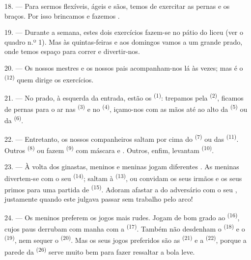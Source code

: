 \VUsaut{5.0mm}
\VUsaut{2.4mm}
\VUsaut{3.0mm}

18. --- Para sermos flexíveis, ágeis e sãos, temos de exercitar as pernas
e os braços. Por isso brincamos e fazemos .

19. --- Durante a semana, estes dois exercícios fazem-se no pátio do
liceu (ver o quadro n.º 1). Mas às quintas-feiras e aos domingos vamos a
um grande prado, onde temos espaço para correr e divertir-nos.

20. --- Os nossos mestres e os nossos pais acompanham-nos lá às vezes;
mas é o  \textsuperscript{(12)} quem dirige os
exercícios.

21. --- No prado, à esquerda da entrada, estão os  \textsuperscript{(1)}: trepamos pela 
\textsuperscript{(2)}, ficamos de pernas para o ar nas 
\textsuperscript{(3)} e no  \textsuperscript{(4)}, içamo-nos com as
mãos até ao alto da  \textsuperscript{(5)} ou da
 \textsuperscript{(6)}.

22. --- Entretanto, os nossos companheiros saltam por cima do  \textsuperscript{(7)} ou das 
\textsuperscript{(11)}. Outros  \textsuperscript{(8)} ou fazem
 \textsuperscript{(9)} com máscara e . Outros,
enfim, levantam  \textsuperscript{(10)}.

\VUsaut{4.6mm}
\VUsaut{3.0mm}

23. --- À volta dos ginastas, meninos e meninas jogam diferentes
. As meninas divertem-se com o seu 
\textsuperscript{(14)}; saltam à  \textsuperscript{(13)}, ou convidam os
seus irmãos e os seus primos para uma partida de 
\textsuperscript{(15)}. Adoram afastar a  do adversário com o seu
, justamente quando este julgava passar sem
trabalho pelo arco!

24. --- Os meninos preferem os jogos mais rudes. Jogam de bom grado ao
 \textsuperscript{(16)}, cujos paus derrubam com manha com a
 \textsuperscript{(17)}. Também não desdenham o 
\textsuperscript{(18)} e o  \textsuperscript{(19)}, nem sequer o
 \textsuperscript{(20)}. Mas os seus jogos preferidos são as
 \textsuperscript{(21)} e a 
\textsuperscript{(22)}, porque a parede da  \textsuperscript{(26)} serve
muito bem para fazer ressaltar a bola leve.

